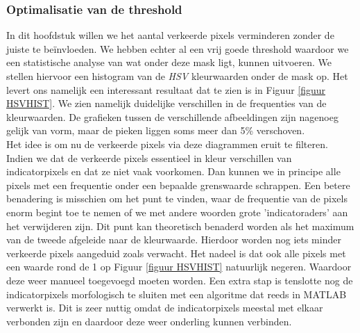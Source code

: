 \documentclass[a4paper,kulak]{kulakarticle}
\begin{document}
\subsubsection{Optimalisatie van de threshold}
In dit hoofdstuk willen we het aantal verkeerde pixels verminderen zonder de juiste te beïnvloeden. We hebben echter al een vrij goede threshold waardoor we een statistische analyse van wat onder deze mask ligt, kunnen uitvoeren. We stellen hiervoor een histogram van de \textit{HSV} kleurwaarden onder de mask op. Het levert ons namelijk een interessant resultaat dat te zien is in Figuur  \ref{figuur HSVHIST}. We zien namelijk duidelijke verschillen in de frequenties van de kleurwaarden. De grafieken tussen de verschillende afbeeldingen zijn nagenoeg gelijk van vorm, maar de pieken liggen soms meer dan 5\% verschoven.\\
Het idee is om nu de verkeerde pixels via deze diagrammen eruit te filteren. Indien we dat de verkeerde pixels essentieel in kleur verschillen van indicatorpixels en dat ze niet vaak voorkomen. Dan kunnen we in principe alle pixels met een frequentie onder een bepaalde grenswaarde schrappen. Een betere benadering is misschien om het punt te vinden, waar de frequentie van de pixels enorm begint toe te nemen of we met andere woorden grote 'indicatoraders' aan het verwijderen zijn. Dit punt kan theoretisch benaderd worden als het maximum van de tweede afgeleide naar de kleurwaarde. Hierdoor worden nog iets minder verkeerde pixels aangeduid zoals verwacht. Het nadeel is dat ook alle pixels met een waarde rond de 1 op Figuur  \ref{figuur HSVHIST} natuurlijk negeren. Waardoor deze weer manueel toegevoegd moeten worden.  
Een extra stap is tenslotte nog de indicatorpixels morfologisch te sluiten met een algoritme dat reeds in MATLAB verwerkt is. Dit is zeer nuttig omdat de indicatorpixels meestal met elkaar verbonden zijn en daardoor deze weer onderling kunnen verbinden.
\end{document}
